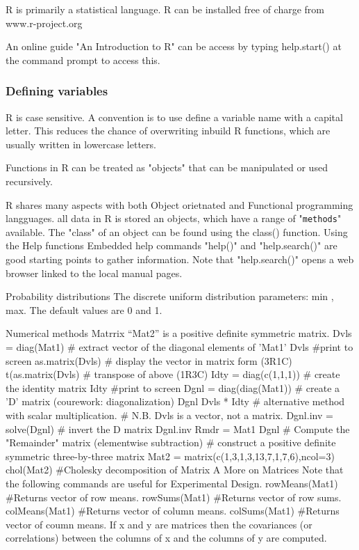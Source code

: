 R is primarily a statistical language.
R can be installed free of charge from www.r-project.org

An online guide "An Introduction to R" can be access by typing
help.start() at the command prompt to access this.

\subsubsection{Defining variables}
R is case sensitive.
A convention is to use define a variable name with a capital letter.
This reduces the chance of overwriting inbuild R functions, which are usually written in lowercase letters.


Functions in R can be treated as "objects" that can be manipulated or used recursively.

R shares many aspects with both Object orietnated and Functional programming langguages.
all data in R is stored an objects, which have a range of "\texttt{methods}" available.
The "class" of an object can be found using the class() function.
Using the Help functions
Embedded help commands "help()" and "help.search()" are good starting points to gather information. 
Note that "help.search()" opens a web browser linked to the local manual pages.
 
 
Probability distributions
The discrete uniform distribution
parameters: min , max.
The default values are 0 and 1.
 

Numerical methods
Matrrix “Mat2” is a positive definite symmetric matrix.
Dvls = diag(Mat1)		# extract vector of the diagonal elements of 'Mat1'
Dvls				#print to screen
as.matrix(Dvls)			# display the vector in matrix form (3R1C)
t(as.matrix(Dvls)		# transpose of above	(1R3C)
Idty = diag(c(1,1,1))		# create the identity matrix
Idty				#print to screen
Dgnl = diag(diag(Mat1))	# create a 'D' matrix 	(courework: diagonalization)
Dgnl				
Dvls * Idty			# alternative method with scalar multiplication.
				# N.B.  Dvls is a vector, not a matrix.
Dgnl.inv = solve(Dgnl)		# invert the D matrix
Dgnl.inv		
Rmdr = Mat1 Dgnl		# Compute the "Remainder" matrix (elementwise subtraction)
# construct a positive definite symmetric three-by-three matrix
Mat2 = matrix(c(1,3,1,3,13,7,1,7,6),ncol=3)
chol(Mat2)			#Cholesky decomposition of Matrix A
More on Matrices
Note that the following commands are useful for Experimental Design.
rowMeans(Mat1) 			#Returns vector of row means. 
rowSums(Mat1) 			#Returns vector of row sums.  
colMeans(Mat1) 			#Returns vector of column means.  
colSums(Mat1) 				#Returns vector of coumn means.  
If x and y are matrices then the covariances (or correlations) between the columns of x and the columns of y are computed.


